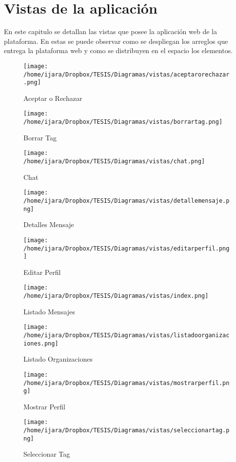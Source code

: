 \documentclass[letterpaper,openright,10pt,oneside]{report}
\begin{document}
\chapter{Vistas de la aplicación}
En este capitulo se detallan las vistas que posee la aplicación web de la plataforma. En estas se puede observar como se despliegan los arreglos que entrega la plataforma web y como se distribuyen en el espacio los elementos.
\begin{figure}[htp]
\centering
\texttt{[image: /home/ijara/Dropbox/TESIS/Diagramas/vistas/aceptarorechazar.png]}
\caption{Aceptar o Rechazar}
\label{}
\end{figure} 
\begin{figure}[htp]
\centering
\texttt{[image: /home/ijara/Dropbox/TESIS/Diagramas/vistas/borrartag.png]}
\caption{Borrar Tag}
\label{}
\end{figure}
\begin{figure}[htp]
\centering
\texttt{[image: /home/ijara/Dropbox/TESIS/Diagramas/vistas/chat.png]}
\caption{Chat}
\label{}
\end{figure}
\begin{figure}[htp]
\centering
\texttt{[image: /home/ijara/Dropbox/TESIS/Diagramas/vistas/detallemensaje.png]}
\caption{Detalles Mensaje}
\label{}
\end{figure}
\begin{figure}[htp]
\centering
\texttt{[image: /home/ijara/Dropbox/TESIS/Diagramas/vistas/editarperfil.png]}
\caption{Editar Perfil}
\label{}
\end{figure}
\begin{figure}[htp]
\centering
\texttt{[image: /home/ijara/Dropbox/TESIS/Diagramas/vistas/index.png]}
\caption{Listado Mensajes}
\label{}
\end{figure}
\begin{figure}[htp]
\centering
\texttt{[image: /home/ijara/Dropbox/TESIS/Diagramas/vistas/listadoorganizaciones.png]}
\caption{Listado Organizaciones}
\label{}
\end{figure}
\begin{figure}[htp]
\centering
\texttt{[image: /home/ijara/Dropbox/TESIS/Diagramas/vistas/mostrarperfil.png]}
\caption{Mostrar Perfil}
\label{}
\end{figure}
\begin{figure}[htp]
\centering
\texttt{[image: /home/ijara/Dropbox/TESIS/Diagramas/vistas/seleccionartag.png]}
\caption{Seleccionar Tag}
\label{}
\end{figure}
\end{document}
